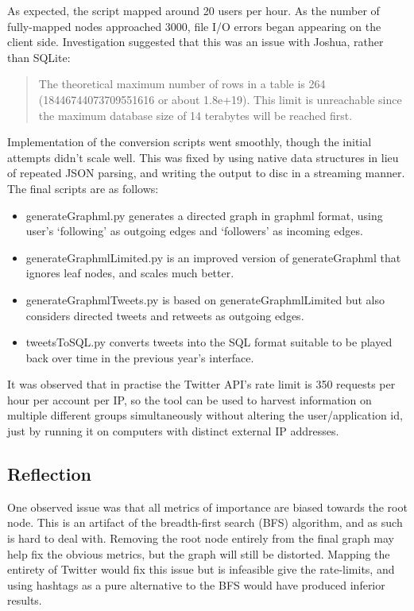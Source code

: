 As expected, the script mapped around 20 users per hour. As the number of fully-mapped nodes approached 3000, file I/O errors began appearing on the client side. Investigation suggested that this was an issue with Joshua, rather than SQLite:

\begin{quote}
The theoretical maximum number of rows in a table is 264 (18446744073709551616 or about 1.8e+19). This limit is unreachable since the maximum database size of 14 terabytes will be reached first.
\end{quote}
\cite{sqliteLimits}

Implementation of the conversion scripts went smoothly, though the initial attempts didn't scale well. This was fixed by using native data structures in lieu of repeated JSON parsing, and writing the output to disc in a streaming manner. The final scripts are as follows:
\begin{itemize}
\item generateGraphml.py generates a directed graph in graphml format, using user's ‘following' as outgoing edges and ‘followers' as incoming edges.
\item generateGraphmlLimited.py is an improved version of generateGraphml that ignores leaf nodes, and scales much better.
\item generateGraphmlTweets.py is based on generateGraphmlLimited but also considers directed tweets and retweets as outgoing edges.
\item tweetsToSQL.py converts tweets into the SQL format suitable to be played back over time in the previous year's interface.
\end{itemize}

It was observed that in practise the Twitter API's rate limit is 350 requests per hour per account per IP, so the tool can be used to harvest information on multiple different groups simultaneously without altering the user/application id, just by running it on computers with distinct external IP addresses.

\subsection{Reflection}
One observed issue was that all metrics of importance are biased towards the root node. This is an artifact of the breadth-first search (BFS) algorithm, and as such is hard to deal with. Removing the root node entirely from the final graph may help fix the obvious metrics, but the graph will still be distorted. Mapping the entirety of Twitter would fix this issue but is infeasible give the rate-limits, and using hashtags as a pure alternative to the BFS would have produced inferior results.

